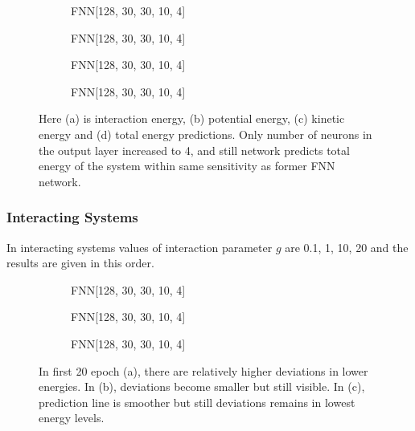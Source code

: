 \documentclass[a4paper,times,12pt]{article}
\begin{document}
\begin{figure}[H]
    \centering
    \begin{subfigure}[t]{0.45\textwidth}
		\centering
        
        \caption{FNN[128, 30, 30, 10, 4]}
		\label{fig:a}
    \end{subfigure}\hfill
    \begin{subfigure}[t]{0.45\textwidth}
		\centering
        
        \caption{FNN[128, 30, 30, 10, 4]}
		\label{fig:b}
    \end{subfigure}\hfill    
    \begin{subfigure}[t]{0.45\textwidth}
        \centering
        
        \caption{FNN[128, 30, 30, 10, 4]}
		\label{fig:c}
    \end{subfigure}\hfill
    \begin{subfigure}[t]{0.45\textwidth}
        \centering
        
        \caption{FNN[128, 30, 30, 10, 4]}
		\label{fig:c}
    \end{subfigure}
	\caption{Here (a) is interaction energy, (b) potential energy, (c) kinetic energy and (d) total energy predictions. Only number of neurons in the output layer increased to 4, and still network predicts total energy of the system within same sensitivity as former FNN network.}
\end{figure}

\subsubsection{Interacting Systems}

In interacting systems values of interaction parameter $g$ are 0.1, 1, 10, 20 and the results are given in this order. 

\begin{figure}[H]
    \centering
    \begin{subfigure}[t]{0.45\textwidth}
		\centering
        
        \caption{FNN[128, 30, 30, 10, 4]}
		\label{fig:a}
    \end{subfigure}\hfill
    \begin{subfigure}[t]{0.45\textwidth}
		\centering
        
        \caption{FNN[128, 30, 30, 10, 4]}
		\label{fig:b}
    \end{subfigure}\hfill    
    \begin{subfigure}[t]{0.45\textwidth}
        \centering
        
        \caption{FNN[128, 30, 30, 10, 4]}
		\label{fig:c}
    \end{subfigure}
	\caption{In first 20 epoch (a), there are relatively higher deviations in lower energies. In (b), deviations become smaller but still visible. In (c), prediction line is smoother but still deviations remains in lowest energy levels.}
\end{figure}
\end{document}
